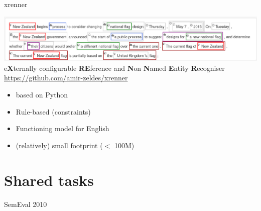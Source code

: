 \documentclass[dvipsnames, 10pt, compress]{beamer}
\begin{document}
\begin{frame}{xrenner}

\begin{center}
\includegraphics[width=\textwidth]{graphics/xrenner.png} \\
   e\textbf{X}ternally configurable \textbf{RE}ference and \textbf{N}on \textbf{N}amed \textbf{E}ntity \textbf{R}ecogniser \\
\url{https://github.com/amir-zeldes/xrenner}

\end{center}

\begin{itemize}
  \item based on Python
  \item Rule-based (constraints)
  \item Functioning model for English
  \item (relatively) small footprint ($<$ 100M)
\end{itemize}


\end{frame}



\section{Shared tasks}

\begin{frame}{SemEval 2010}




\end{frame}
\end{document}
